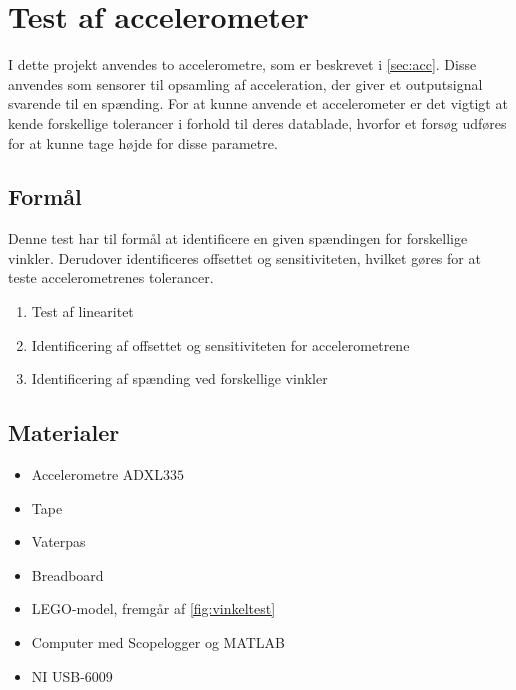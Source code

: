 \section{Test af accelerometer} 
\label{sec:test_acc}
I dette projekt anvendes to accelerometre, som er beskrevet i \autoref{sec:acc}. Disse anvendes som sensorer til opsamling af acceleration, der giver et outputsignal svarende til en spænding. For at kunne anvende et accelerometer er det vigtigt at kende forskellige tolerancer i forhold til deres datablade, hvorfor et forsøg udføres for at kunne tage højde for disse parametre.

\subsection{Formål}
Denne test har til formål at identificere en given spændingen for forskellige vinkler. Derudover identificeres %
offsettet og sensitiviteten, hvilket gøres for at teste accelerometrenes tolerancer.

\begin{enumerate}
\item Test af linearitet
\item Identificering af offsettet og sensitiviteten for accelerometrene
\item Identificering af spænding ved forskellige vinkler
\end{enumerate}

\subsection{Materialer}
\begin{itemize}
\item Accelerometre ADXL$335$
\item Tape
\item Vaterpas
\item Breadboard
\item LEGO-model, fremgår af \autoref{fig:vinkeltest}
\item Computer med Scopelogger og MATLAB
\item NI USB-6009
\end{itemize}

